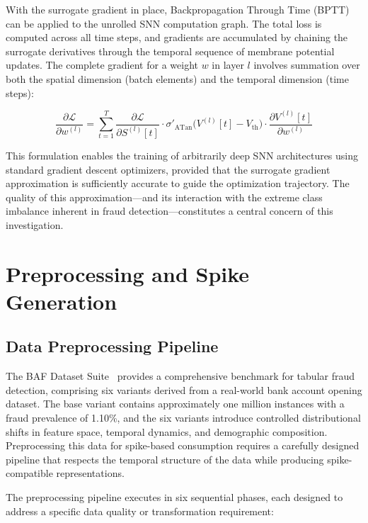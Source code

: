 With the surrogate gradient in place, Backpropagation Through Time (BPTT) can be applied to the unrolled SNN computation graph. The total loss is computed across all time steps, and gradients are accumulated by chaining the surrogate derivatives through the temporal sequence of membrane potential updates. The complete gradient for a weight $w$ in layer $l$ involves summation over both the spatial dimension (batch elements) and the temporal dimension (time steps):

\begin{equation}
\frac{\partial \mathcal{L}}{\partial w^{(l)}} = \sum_{t=1}^{T} \frac{\partial \mathcal{L}}{\partial S^{(l)}[t]} \cdot \sigma'_{\text{ATan}}\bigl(V^{(l)}[t] - V_{\text{th}}\bigr) \cdot \frac{\partial V^{(l)}[t]}{\partial w^{(l)}}
\label{eq:snn-bptt}
\end{equation}

This formulation enables the training of arbitrarily deep SNN architectures using standard gradient descent optimizers, provided that the surrogate gradient approximation is sufficiently accurate to guide the optimization trajectory. The quality of this approximation---and its interaction with the extreme class imbalance inherent in fraud detection---constitutes a central concern of this investigation.

\section{Preprocessing and Spike Generation}

\subsection{Data Preprocessing Pipeline}

The BAF Dataset Suite~\cite{jesus2022bank,feedzai2022baf} provides a comprehensive benchmark for tabular fraud detection, comprising six variants derived from a real-world bank account opening dataset. The base variant contains approximately one million instances with a fraud prevalence of 1.10\%, and the six variants introduce controlled distributional shifts in feature space, temporal dynamics, and demographic composition. Preprocessing this data for spike-based consumption requires a carefully designed pipeline that respects the temporal structure of the data while producing spike-compatible representations.

The preprocessing pipeline executes in six sequential phases, each designed to address a specific data quality or transformation requirement:

